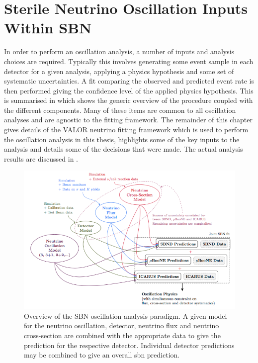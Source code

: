 \chapter{Sterile Neutrino Oscillation Inputs Within SBN}
\label{chap:osc_inputs}

In order to perform an oscillation analysis, a number of inputs and analysis choices are required. Typically this involves generating some event sample in each detector for a given analysis, applying a physics hypothesis and some set of systematic uncertainties. A fit comparing the observed and predicted event rate is then performed giving the confidence level of the applied physics hypothesis. This is summarised in  which shows the generic overview of the procedure coupled with the different components. Many of these items are common to all oscillation analyses and are agnostic to the fitting framework. The remainder of this chapter gives details of the VALOR neutrino fitting framework which is used to perform the oscillation analysis in this thesis, highlights some of the key inputs to the analysis and details some of the decisions that were made. The actual analysis results are discussed in .

\begin{figure}[!h]
    \centering
    \includegraphics[width = \textwidth]{figures-chap5/valor_analysis.png}
    \caption[SBN Oscillation analysis paradigm.]{Overview of the SBN oscillation analysis paradigm. A given model for the neutrino oscillation, detector, neutrino flux and neutrino cross-section are combined with the appropriate data to give the prediction for the respective detector. Individual detector predictions may be combined to give an overall \gls{sbn} prediction. }
    \label{fig:analysis_paradigm}
\end{figure}

